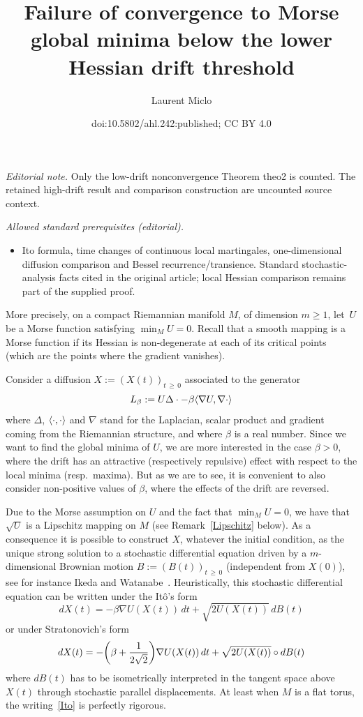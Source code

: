 \documentclass[10pt]{amsart}
\title{Failure of convergence to Morse global minima below the lower Hessian drift threshold}
\author{Laurent Miclo}
\date{doi:10.5802/ahl.242:published; CC BY 4.0}
\theoremstyle{definition}\newtheorem{defi}[theo]{Definition}\newtheorem{rema}[theo]{Remark}\newtheorem{exam}[theo]{Example}\newtheorem{exem}[theo]{Example}\newtheorem{nota}[theo]{Notation}
\newcommand{\f}[2]{\frac{#1}{#2}}
\newcommand{\na}{\nabla}
\newcommand{\tr}{\Delta}
\let\originalleft\left
\let\originalright\right
\renewcommand{\left}{\mathopen{}\mathclose\bgroup\originalleft}
\renewcommand{\right}{\aftergroup\egroup\originalright}
\begin{document}
\maketitle
\noindent\textit{Editorial note.} Only the low-drift nonconvergence Theorem theo2 is counted. The retained high-drift result and comparison construction are uncounted source context.\par\medskip
\noindent\textit{Allowed standard prerequisites (editorial).}\begin{itemize}
\item Ito formula, time changes of continuous local martingales, one-dimensional diffusion comparison and Bessel recurrence/transience. Standard stochastic-analysis facts cited in the original article; local Hessian comparison remains part of the supplied proof.
\end{itemize}\medskip
 More precisely, on a compact Riemannian manifold $M$, of dimension $m\geq 1$, let~$U$ be a Morse function satisfying $\min_MU=0$. Recall that a smooth mapping is a Morse function if its Hessian is non-degenerate at each of its critical points (which are the points where the gradient vanishes).

Consider a diffusion $X:= (X(t))_{t\,\geq\,0}$ associated to the generator
\begin{equation*}
L_\beta := U \tr \cdot-\beta\left\langle \na U,\na \cdot\right\rangle
\end{equation*}
where $\tr$, $\left\langle\cdot,\cdot\right\rangle$ and $\na$ stand for the Laplacian, scalar product and gradient coming from the Riemannian structure, and where $\beta$ is a real number. Since we want to find the global minima of $U$, we are more interested in the case $\beta>0$, where the drift has an attractive (respectively repulsive) effect with respect to the local minima (resp.\ maxima). But as we are to see, it is convenient to also consider non-positive values of $\beta$, where the effects of the drift are reversed.


Due to the Morse assumption on $U$ and the fact that $\min_MU=0$, we have that $\sqrt{U}$ is a Lipschitz mapping on $M$ (see Remark~\ref{Lipschitz} below). As a consequence it is possible to construct $X$, whatever the initial condition, as the unique strong solution to a stochastic differential equation driven by a $m$-dimensional Brownian motion $B:= (B(t))_{t\,\geq\,0}$ (independent from $X(0)$), see for
instance Ikeda and Watanabe~\cite{MR1011252}. Heuristically, this stochastic differential equation can be written under the Itô's form
\begin{equation}\label{Ito} 
dX(t)=-\beta\na U(X(t))
\,
dt +\sqrt{2 U(X(t))}\, dB(t)
\end{equation}
or under Stratonovich's form
\begin{equation*}
dX(t) = -\left(\beta+\f{1}{2\sqrt{2}}\right)\na U(X(t))\, dt +\sqrt{2 U(X(t))}\circ dB(t)
\end{equation*} where $dB(t)$ has to be isometrically interpreted in the tangent space above $X(t)$ through stochastic parallel displacements. At least when $M$ is a flat torus, the writing~\eqref{Ito} is perfectly rigorous.
\end{document}
